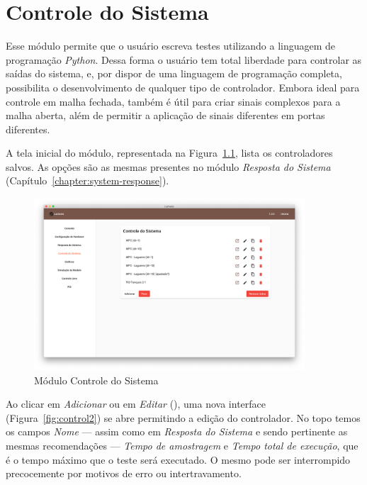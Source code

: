
\chapter{Controle do Sistema}%
\label{chapter:system-control}

Esse módulo permite que o usuário escreva testes utilizando a linguagem de
programação \textit{Python}. Dessa forma o usuário tem total liberdade para
controlar as saídas do sistema, e, por dispor de uma linguagem de programação
completa, possibilita o desenvolvimento de qualquer tipo de controlador. Embora
ideal para controle em malha fechada, também é útil para criar sinais complexos
para a malha aberta, além de permitir a aplicação de sinais diferentes em portas
diferentes.

A tela inicial do módulo, representada na Figura~\ref{fig:control1}, lista os
controladores salvos. As opções são as mesmas presentes no módulo
\textit{Resposta do Sistema} (Capítulo~\ref{chapter:system-response}).

\begin{figure}[ht!]
    \centering
    \includegraphics[width=0.9\textwidth]{imgs/control1}
    \caption[Módulo Controle do Sistema]{Módulo Controle do Sistema}%
    \label{fig:control1}
\end{figure}

Ao clicar em \textit{Adicionar} ou em \textit{Editar} (), uma
nova interface (Figura~\ref{fig:control2}) se abre permitindo a edição do
controlador. No topo temos os campos \textit{Nome} --- assim como em
\textit{Resposta do Sistema} e sendo pertinente as mesmas recomendações ---
\textit{Tempo de amostragem} e \textit{Tempo total de execução}, que é o tempo
máximo que o teste será executado. O mesmo pode ser interrompido precocemente
por motivos de erro ou intertravamento.

